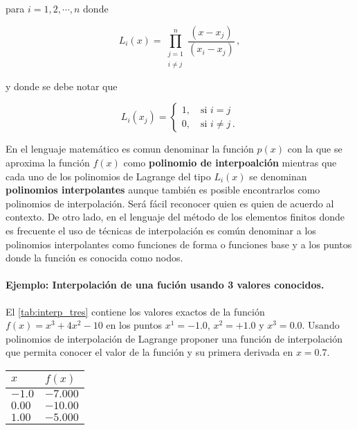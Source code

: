 para $i = 1, 2, \cdots, n$ donde

\begin{equation}\label{eq:interp_coef}
  L_i(x) = \prod_{\substack{j = 1\\ i \ne j}}^n \frac{(x - x_j)}{(x_i - x_j)}\, 
  ,
\end{equation}

y donde se debe notar que

\[L_i(x_j) =
\begin{cases}
1,\quad \text{si } i = j\\
0,\quad \text{si } i \neq j\, .
\end{cases}\]

\begin{tcolorbox}
	En el lenguaje matemático es comun denominar la función $p(x)$ con la que se aproxima la función $f(x)$ como {\bf polinomio de interpoalción} mientras que cada uno de los polinomios de Lagrange del tipo $L_i(x)$ se denominan {\bf polinomios interpolantes} aunque también es posible encontrarlos como polinomios de interpolación. Será fácil reconocer quien es quien de acuerdo al contexto. De otro lado, en el lenguaje del método de los elementos finitos donde es frecuente el uso de técnicas de interpolación es común denominar a los polinomios interpolantes como funciones de forma o funciones base y a los puntos donde la función es conocida como nodos.
\end{tcolorbox}


\paragraph{Ejemplo: Interpolación de una fución usando 3 valores conocidos.}
El \cref{tab:interp_tres} contiene los valores exactos de la función $f(x) = {x^3} + 4{x^2} - 10$ en los puntos $x^1 =  - 1.0$, $x^2 =  + 1.0$ y $x^3 = 0.0$. Usando polinomios de interpolación de Lagrange proponer una función de interpolación que permita conocer el valor de la función y su primera derivada en $x=0.7$.
\begin{center}
\begin{tabular}{ll}
  \hline
  $x$ & $f(x)$ \\
  \hline 
  $-1.0$  & $-7.000$  \\
  $ 0.00$  & $-10.00$  \\
  $ 1.00$  & $-5.000$  \\
  \hline
\end{tabular}
\label{tab:interp_tres}
\end{center}


